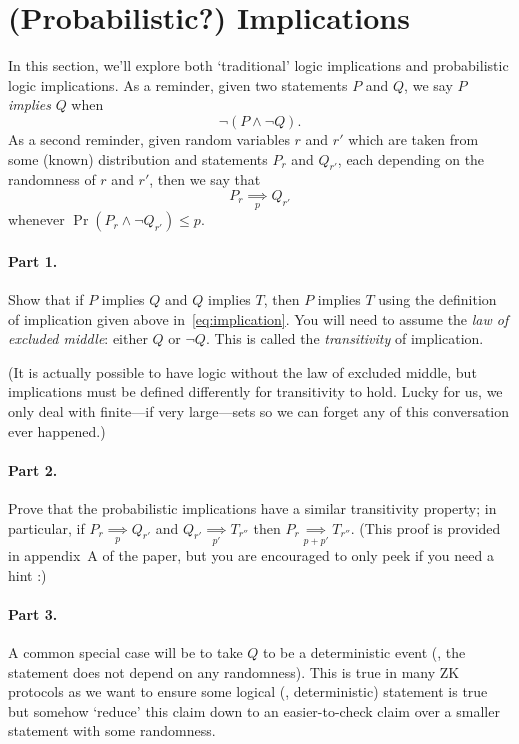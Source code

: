 \documentclass[12pt,hidelinks]{article}
\newcommand{\impliesn}[1]{\underset{#1}{\implies}}
\newcommand{\impliesp}{\impliesn{p}}
\newcommand{\impliespp}{\impliesn{p'}}
\begin{document}
\section{(Probabilistic?) Implications}
In this section, we'll explore both `traditional' logic implications
and probabilistic logic implications. As a reminder, given two statements
$P$ and $Q$, we say $P$ \emph{implies} $Q$ when
\begin{equation}\label{eq:implication}
    \neg(P \wedge \neg Q).
\end{equation}
As a second reminder, given random variables $r$ and $r'$ which are taken
from some (known) distribution and statements $P_r$ and $Q_{r'}$, each
depending on the randomness of $r$ and $r'$, then we say that
\[
    P_r \impliesp Q_{r'}
\]
whenever $\Pr(P_r \wedge \neg Q_{r'}) \le p$.


\paragraph{Part 1.} Show that if $P$ implies $Q$ and $Q$ implies $T$, then $P$
implies $T$ using the definition of implication given
above in~\eqref{eq:implication}. You will need to assume the \emph{law of
excluded middle}: either $Q$ or $\neg Q$. This is called the \emph{transitivity}
of implication.

(It is actually possible to have logic without the law of excluded middle, but
implications must be defined differently for transitivity to hold. Lucky for
us, we only deal with finite---if very large---sets so we can forget any of
this conversation ever happened.)

\paragraph{Part 2.} Prove that the probabilistic implications have a similar
transitivity property; in particular, if $P_r \impliesp Q_{r'}$ and $Q_{r'}
\impliespp T_{r''}$ then $P_r \impliesn{p + p'} T_{r''}$. (This proof is
provided in appendix~A of the paper, but you are encouraged to only peek if you
need a hint :)

\paragraph{Part 3.} A common special case will be to take $Q$ to be a
deterministic event (\ie, the statement does not depend on any randomness).
This is true in many ZK protocols as we want to ensure some logical (\ie,
deterministic) statement is true but somehow `reduce' this claim down to an
easier-to-check claim over a smaller statement with some randomness.
\end{document}
